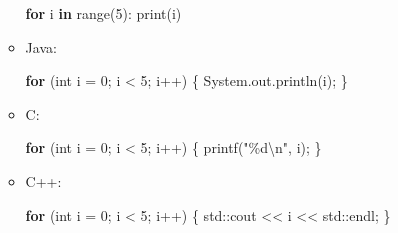 \documentclass[
  letterpaper,
]{scrbook}
\newenvironment{Shaded}{\begin{snugshade}}{\end{snugshade}}
\newcommand{\BuiltInTok}[1]{\textcolor[rgb]{0.00,0.23,0.31}{#1}}
\newcommand{\ControlFlowTok}[1]{\textcolor[rgb]{0.00,0.23,0.31}{\textbf{#1}}}
\newcommand{\DataTypeTok}[1]{\textcolor[rgb]{0.68,0.00,0.00}{#1}}
\newcommand{\DecValTok}[1]{\textcolor[rgb]{0.68,0.00,0.00}{#1}}
\newcommand{\FunctionTok}[1]{\textcolor[rgb]{0.28,0.35,0.67}{#1}}
\newcommand{\KeywordTok}[1]{\textcolor[rgb]{0.00,0.23,0.31}{\textbf{#1}}}
\newcommand{\NormalTok}[1]{\textcolor[rgb]{0.00,0.23,0.31}{#1}}
\newcommand{\OperatorTok}[1]{\textcolor[rgb]{0.37,0.37,0.37}{#1}}
\newcommand{\SpecialCharTok}[1]{\textcolor[rgb]{0.37,0.37,0.37}{#1}}
\newcommand{\StringTok}[1]{\textcolor[rgb]{0.13,0.47,0.30}{#1}}
\begin{document}
\begin{itemize}
\begin{itemize}
\begin{Shaded}
\begin{Highlighting}[]
\ControlFlowTok{for}\NormalTok{ i }\KeywordTok{in} \BuiltInTok{range}\NormalTok{(}\DecValTok{5}\NormalTok{):}
  \BuiltInTok{print}\NormalTok{(i)}
\end{Highlighting}
\end{Shaded}
  \item
    Java:

\begin{Shaded}
\begin{Highlighting}[]
\ControlFlowTok{for} \OperatorTok{(}\DataTypeTok{int}\NormalTok{ i }\OperatorTok{=} \DecValTok{0}\OperatorTok{;}\NormalTok{ i }\OperatorTok{\textless{}} \DecValTok{5}\OperatorTok{;}\NormalTok{ i}\OperatorTok{++)} \OperatorTok{\{}
  \BuiltInTok{System}\OperatorTok{.}\FunctionTok{out}\OperatorTok{.}\FunctionTok{println}\OperatorTok{(}\NormalTok{i}\OperatorTok{);}
\OperatorTok{\}}
\end{Highlighting}
\end{Shaded}
  \item
    C:

\begin{Shaded}
\begin{Highlighting}[]
\ControlFlowTok{for} \OperatorTok{(}\DataTypeTok{int}\NormalTok{ i }\OperatorTok{=} \DecValTok{0}\OperatorTok{;}\NormalTok{ i }\OperatorTok{\textless{}} \DecValTok{5}\OperatorTok{;}\NormalTok{ i}\OperatorTok{++)} \OperatorTok{\{}
\NormalTok{  printf}\OperatorTok{(}\StringTok{"}\SpecialCharTok{\%d\textbackslash{}n}\StringTok{"}\OperatorTok{,}\NormalTok{ i}\OperatorTok{);}
\OperatorTok{\}}
\end{Highlighting}
\end{Shaded}
  \item
    C++:

\begin{Shaded}
\begin{Highlighting}[]
\ControlFlowTok{for} \OperatorTok{(}\DataTypeTok{int}\NormalTok{ i }\OperatorTok{=} \DecValTok{0}\OperatorTok{;}\NormalTok{ i }\OperatorTok{\textless{}} \DecValTok{5}\OperatorTok{;}\NormalTok{ i}\OperatorTok{++)} \OperatorTok{\{}
  \BuiltInTok{std::}\NormalTok{cout }\OperatorTok{\textless{}\textless{}}\NormalTok{ i }\OperatorTok{\textless{}\textless{}} \BuiltInTok{std::}\NormalTok{endl}\OperatorTok{;}
\OperatorTok{\}}
\end{Highlighting}
\end{Shaded}
  \end{itemize}
\end{itemize}
\end{document}
